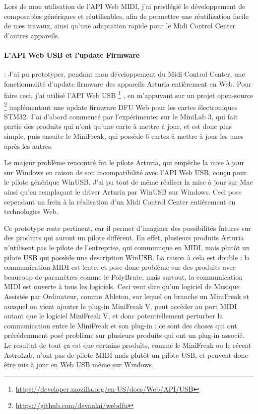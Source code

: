 \documentclass[francais]{rapportPFE}  %
\begin{document}
Lors de mon utilisation de l'API Web MIDI, j'ai privilégié le développement de composables génériques et réutilisables, afin de permettre une réutilisation facile de mes travaux, ainsi qu'une adaptation rapide pour le Midi Control Center d'autres appareils.


\paragraph{L'API Web USB et l'update Firmware}:
J'ai pu prototyper, pendant mon développement du Midi Control Center, une fonctionnalité d'update firmware des appareils Arturia entièrement en Web. Pour faire ceci, j'ai utilisé l'API Web USB
\footnote{\url{https://developer.mozilla.org/en-US/docs/Web/API/USB}} 
, en m'appuyant sur un projet open-source 
\footnote{\url{https://github.com/devanlai/webdfu}}
implémentant une update firmware DFU Web pour les cartes électroniques STM32.
J'ai d'abord commencé par l'expérimenter sur le MiniLab 3, qui fait partie des produits qui n'ont qu'une carte à mettre à jour, et est donc plus simple, puis ensuite le MiniFreak, qui possède 6 cartes à mettre à jour les unes après les autres.

Le majeur problème rencontré fut le pilote Arturia, qui empêche la mise à jour sur Windows en raison de son incompatibilité avec l'API Web USB, conçu pour le pilote générique WinUSB. J'ai pu tout de même réaliser la mise à jour sur Mac ainsi qu'en remplaçant le driver Arturia par WinUSB sur Windows. Ceci pose cependant un frein à la réalisation d'un Midi Control Center entièrement en technologies Web.

Ce prototype reste pertinent, car il permet d'imaginer des possibilités futures sur des produits qui auront un pilote différent.
En effet, plusieurs produits Arturia n'utilisent pas le pilote de l'entreprise, qui communique en MIDI, mais plutôt un pilote USB qui possède une description WinUSB. La raison à cela est double : la communication MIDI est lente, et pose donc problème sur des produits avec beaucoup de paramètres comme le PolyBrute, mais surtout, la communication MIDI est ouverte à tous les logiciels. Ceci veut dire qu'un logiciel de Musique Assistée par Ordinateur, comme Ableton, sur lequel on branche un MiniFreak et auxquel on vient ajouter le plug-in MiniFreak V, peut accèder au port MIDI autant que le logiciel MiniFreak V, et donc potentiellement perturber la communication entre le MiniFreak et son plug-in : ce sont des choses qui ont précédemment posé problème sur plusieurs produits qui ont un plug-in associé.
Le resultat de tout ça est que certains produits, comme le MiniFreak ou le récent AstroLab, n'ont pas de pilote MIDI mais plutôt un pilote USB, et peuvent donc être mis à jour en Web USB même sur Windows.
\end{document}
